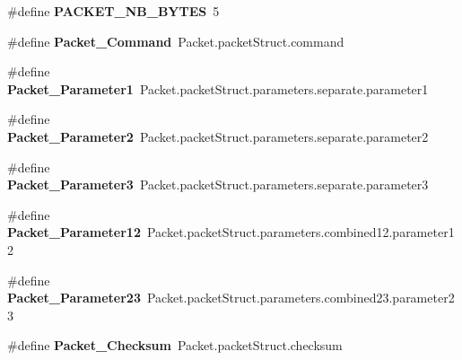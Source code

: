 \begin{DoxyCompactItemize}
\item 
\hypertarget{group__packet__module_ga5916165249c1d4739d21a001d5a4775d}{}\#define {\bfseries P\+A\+C\+K\+E\+T\+\_\+\+N\+B\+\_\+\+B\+Y\+T\+E\+S}~5\label{group__packet__module_ga5916165249c1d4739d21a001d5a4775d}

\item 
\hypertarget{group__packet__module_ga0a6b54bd6327268c60b131046279dc73}{}\#define {\bfseries Packet\+\_\+\+Command}~Packet.\+packet\+Struct.\+command\label{group__packet__module_ga0a6b54bd6327268c60b131046279dc73}

\item 
\hypertarget{group__packet__module_gac57a9c4b28d49a596ca5fa943e40b9af}{}\#define {\bfseries Packet\+\_\+\+Parameter1}~Packet.\+packet\+Struct.\+parameters.\+separate.\+parameter1\label{group__packet__module_gac57a9c4b28d49a596ca5fa943e40b9af}

\item 
\hypertarget{group__packet__module_ga45a05df635f3e5b1395d008f1901a4d1}{}\#define {\bfseries Packet\+\_\+\+Parameter2}~Packet.\+packet\+Struct.\+parameters.\+separate.\+parameter2\label{group__packet__module_ga45a05df635f3e5b1395d008f1901a4d1}

\item 
\hypertarget{group__packet__module_ga625e727e1e36680f574a360bc3747695}{}\#define {\bfseries Packet\+\_\+\+Parameter3}~Packet.\+packet\+Struct.\+parameters.\+separate.\+parameter3\label{group__packet__module_ga625e727e1e36680f574a360bc3747695}

\item 
\hypertarget{group__packet__module_ga263d9441afcb8d453f9d25e637d34907}{}\#define {\bfseries Packet\+\_\+\+Parameter12}~Packet.\+packet\+Struct.\+parameters.\+combined12.\+parameter12\label{group__packet__module_ga263d9441afcb8d453f9d25e637d34907}

\item 
\hypertarget{group__packet__module_ga59d544f3e4a53730d58061ec7203f7ed}{}\#define {\bfseries Packet\+\_\+\+Parameter23}~Packet.\+packet\+Struct.\+parameters.\+combined23.\+parameter23\label{group__packet__module_ga59d544f3e4a53730d58061ec7203f7ed}

\item 
\hypertarget{group__packet__module_gade7afcb767f4375a5728e1804376bd1b}{}\#define {\bfseries Packet\+\_\+\+Checksum}~Packet.\+packet\+Struct.\+checksum\label{group__packet__module_gade7afcb767f4375a5728e1804376bd1b}

\end{DoxyCompactItemize}
